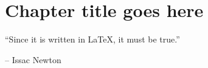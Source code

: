 \chapter{Chapter title goes here} \label{chap:chap-3}

\epigraph{\enquote{Since it is written in \LaTeX, it must be true.}}{-- Issac Newton}


\blindtext 